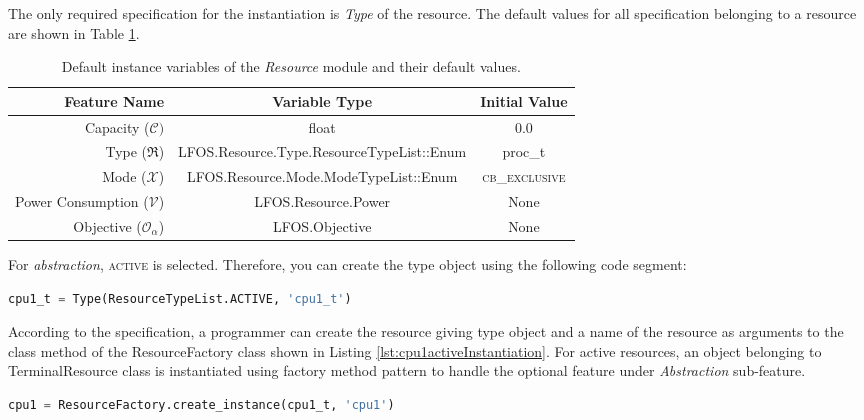 \documentclass[]{scrartcl}
\begin{document}
The only required specification for the instantiation is \emph{Type} of the resource. The default values for all specification belonging to a resource are
shown in Table \ref{tab:resource_vars_default}.

\begin{table}[!htb]
	\centering
	\begin{tabular}{r || c | c |}
		\hline
		\textbf{Feature Name} & \textbf{Variable Type} & \textbf{Initial Value} \\ \hline \hline
		Capacity ($\mathcal{C})$ & float & $0.0$ \\ \hline
		Type ($\Re$) & LFOS.Resource.Type.ResourceTypeList::Enum & \textsf{proc\_t} \\ \hline
		Mode ($\mathcal{X}$) & LFOS.Resource.Mode.ModeTypeList::Enum & \textsc{cb\_exclusive} \\ \hline
		Power Consumption ($\mathcal{V}$) & LFOS.Resource.Power & \textsf{None} \\ \hline
		Objective ($\mathcal{O}_{\alpha}$) & LFOS.Objective & \textsf{None} \\ \hline
	\end{tabular}
	\caption{Default instance variables of the \emph{Resource} module and their default values.}
	\label{tab:resource_vars_default}
\end{table}

            
For \emph{abstraction}, \textsc{active} is selected. Therefore, you can create the type object using the following code segment:

\begin{lstlisting}[language=Python, frame=single, label={lst:activeType}, caption={Active resource type object instantiation}]
cpu1_t = Type(ResourceTypeList.ACTIVE, 'cpu1_t')
\end{lstlisting}
        
        
According to the specification, a programmer can create the resource giving type object and a name of the resource as arguments to the class method of the
ResourceFactory class shown in Listing \ref{lst:cpu1activeInstantiation}. For active resources, an object belonging to \textsf{TerminalResource} class is instantiated
using factory method pattern to handle the optional feature under \emph{Abstraction} sub-feature.


\begin{lstlisting}[language=Python, frame=single, label={lst:cpu1activeInstantiation}, caption={Active resource instantiation using ResourceFactory class}]
cpu1 = ResourceFactory.create_instance(cpu1_t, 'cpu1')
\end{lstlisting}
        
\end{document}
